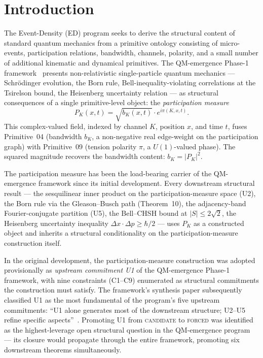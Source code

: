 \documentclass[11pt,a4paper]{article}
\begin{document}
\section{Introduction}

The Event-Density (ED) program seeks to derive the structural content of standard quantum mechanics from a primitive ontology consisting of micro-events, participation relations, bandwidth, channels, polarity, and a small number of additional kinematic and dynamical primitives. The QM-emergence Phase-1 framework~\cite{phase1} presents non-relativistic single-particle quantum mechanics --- Schr\"odinger evolution, the Born rule, Bell-inequality-violating correlations at the Tsirelson bound, the Heisenberg uncertainty relation --- as structural consequences of a single primitive-level object: the \emph{participation measure}
\[
P_K(x, t) = \sqrt{b_K(x, t)} \cdot e^{i \pi(K, x, t)}.
\]
This complex-valued field, indexed by channel $K$, position $x$, and time $t$, fuses Primitive~04 (bandwidth $b_K$, a non-negative real edge-weight on the participation graph) with Primitive~09 (tension polarity $\pi$, a $U(1)$-valued phase). The squared magnitude recovers the bandwidth content: $b_K = |P_K|^2$.

The participation measure has been the load-bearing carrier of the QM-emergence framework since its initial development. Every downstream structural result --- the sesquilinear inner product on the participation-measure space (U2), the Born rule via the Gleason--Busch path (Theorem~10), the adjacency-band Fourier-conjugate partition (U5), the Bell--CHSH bound at $|S| \leq 2\sqrt{2}$, the Heisenberg uncertainty inequality $\Delta x \cdot \Delta p \geq \hbar/2$ --- uses $P_K$ as a constructed object and inherits a structural conditionality on the participation-measure construction itself.

In the original development, the participation-measure construction was adopted provisionally as \emph{upstream commitment U1} of the QM-emergence Phase-1 framework, with nine constraints (C1--C9) enumerated as structural commitments the construction must satisfy. The framework's synthesis paper subsequently classified U1 as the most fundamental of the program's five upstream commitments: ``U1 alone generates most of the downstream structure; U2--U5 refine specific aspects''~\cite[\S 4.2]{phase1}. Promoting U1 from \textsc{candidate} to \textsc{forced} was identified as the highest-leverage open structural question in the QM-emergence program --- its closure would propagate through the entire framework, promoting six downstream theorems simultaneously.
\end{document}

